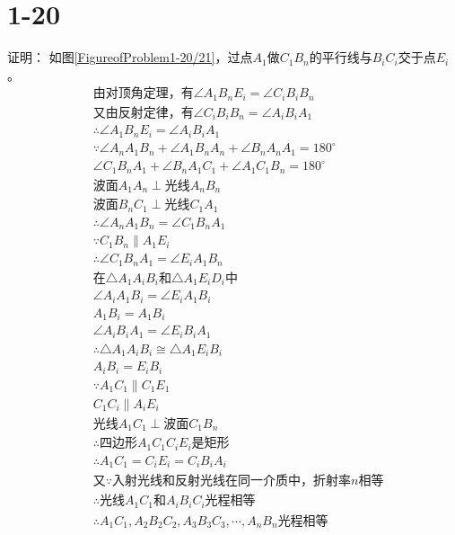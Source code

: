 \documentclass[10pt,a4paper]{article}
\theoremstyle{remark}
\begin{document}
\section*{1-20}证明：
如图\ref{FigureofProblem1-20/21}，过点$A_1$做$C_1B_n$的平行线与$B_iC_i$交于点$E_i$。
\begin{align*}
&\text{由对顶角定理，有}\angle A_1B_nE_i = \angle C_iB_iB_n\\
&\text{又由反射定律，有}\angle C_iB_iB_n = \angle A_iB_iA_1\\
&\therefore \angle A_1B_nE_i = \angle A_iB_iA_1\\
&\because \angle A_nA_1B_n + \angle A_1B_nA_n + \angle B_nA_nA_1 = 180^{\circ}\\
&\angle C_1B_nA_1 + \angle B_nA_1C_1 + \angle A_1C_1B_n = 180^{\circ}\\
&\text{波面}A_1A_n \perp \text{光线}A_nB_n\\
&\text{波面}B_nC_1 \perp \text{光线}C_1A_1\\
&\therefore \angle A_nA_1B_n = \angle C_1B_nA_1\\
&\because C_1B_n \parallel A_1E_i\\
&\therefore \angle C_1B_nA_1 = \angle E_iA_1B_n\\
&\text{在}\triangle A_1A_iB_i\text{和}\triangle A_1E_iD_i\text{中}\\
&\angle A_iA_1B_i = \angle E_iA_1B_i\\
&A_1B_i = A_1B_i\\
&\angle A_iB_iA_1 = \angle E_iB_iA_1\\
&\therefore \triangle A_1A_iB_i \cong \triangle A_1E_iB_i\\
&A_iB_i = E_iB_i\\
&\because A_1C_1 \parallel C_1E_1\\
&C_1C_i \parallel A_iE_i\\
&\text{光线}A_1C_1 \perp \text{波面}C_1B_n\\
&\therefore \text{四边形}A_1C_1C_iE_i\text{是矩形}\\
&\therefore A_1C_1 = C_iE_i = C_iB_iA_i\\
&\text{又}\because\text{入射光线和反射光线在同一介质中，折射率}n\text{相等}\\
&\therefore\text{光线}A_1C_1\text{和}A_iB_iC_i\text{光程相等}\\
&\therefore A_1C_1,A_2B_2C_2,A_3B_3C_3,\cdots,A_nB_n\text{光程相等}
\end{align*}
\end{document}

